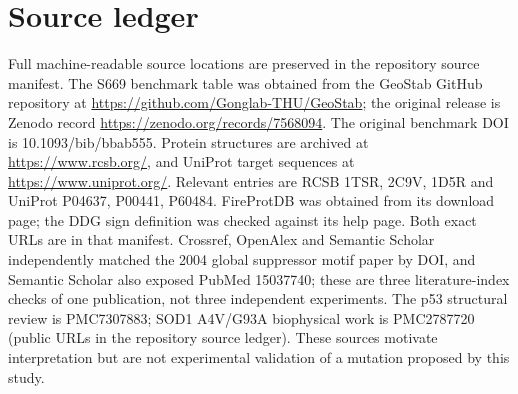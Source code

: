 \documentclass[11pt]{article}
\begin{document}
\section{Source ledger}
Full machine-readable source locations are preserved in the repository source manifest. The S669 benchmark table was obtained from the GeoStab GitHub repository at \url{https://github.com/Gonglab-THU/GeoStab}; the original release is Zenodo record \url{https://zenodo.org/records/7568094}. The original benchmark DOI is 10.1093/bib/bbab555. Protein structures are archived at \url{https://www.rcsb.org/}, and UniProt target sequences at \url{https://www.uniprot.org/}. Relevant entries are RCSB 1TSR, 2C9V, 1D5R and UniProt P04637, P00441, P60484. FireProtDB was obtained from its download page; the DDG sign definition was checked against its help page. Both exact URLs are in that manifest. Crossref, OpenAlex and Semantic Scholar independently matched the 2004 global suppressor motif paper by DOI, and Semantic Scholar also exposed PubMed 15037740; these are three literature-index checks of one publication, not three independent experiments. The p53 structural review is PMC7307883; SOD1 A4V/G93A biophysical work is PMC2787720 (public URLs in the repository source ledger). These sources motivate interpretation but are not experimental validation of a mutation proposed by this study.





\end{document}
